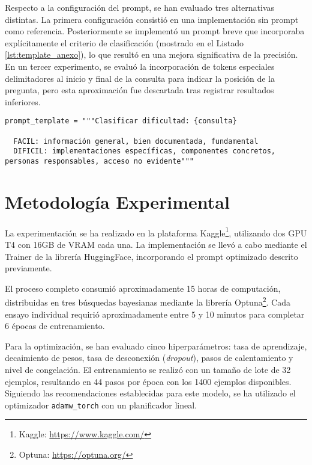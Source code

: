 Respecto a la configuración del prompt, se han evaluado tres alternativas distintas. La primera configuración consistió en una implementación sin prompt como referencia. Posteriormente se implementó un prompt breve que incorporaba explícitamente el criterio de clasificación (mostrado en el Listado \ref{lst:template_anexo}), lo que resultó en una mejora significativa de la precisión. En un tercer experimento, se evaluó la incorporación de tokens especiales delimitadores al inicio y final de la consulta para indicar la posición de la pregunta, pero esta aproximación fue descartada tras registrar resultados inferiores.

\begin{lstlisting}[caption={Plantilla del prompt para ejemplos del modelo clasificador},label={lst:template_anexo}]
  prompt_template = """Clasificar dificultad: {consulta}

  FACIL: información general, bien documentada, fundamental
  DIFICIL: implementaciones específicas, componentes concretos, personas responsables, acceso no evidente"""
\end{lstlisting}

\section{Metodología Experimental}

La experimentación se ha realizado en la plataforma Kaggle\footnote{Kaggle: \url{https://www.kaggle.com/}}, utilizando dos GPU T4 con 16GB de VRAM cada una. La implementación se llevó a cabo mediante el Trainer de la librería HuggingFace, incorporando el prompt optimizado descrito previamente.

El proceso completo consumió aproximadamente 15 horas de computación, distribuidas en tres búsquedas bayesianas mediante la librería Optuna\footnote{Optuna: \url{https://optuna.org/}}. Cada ensayo individual requirió aproximadamente entre 5 y 10 minutos para completar 6 épocas de entrenamiento.

Para la optimización, se han evaluado cinco hiperparámetros: tasa de aprendizaje, decaimiento de pesos, tasa de desconexión (\textit{dropout}), pasos de calentamiento y nivel de congelación. El entrenamiento se realizó con un tamaño de lote de 32 ejemplos, resultando en 44 pasos por época con los 1400 ejemplos disponibles. Siguiendo las recomendaciones establecidas para este modelo, se ha utilizado el optimizador \texttt{adamw\_torch} con un planificador lineal.

